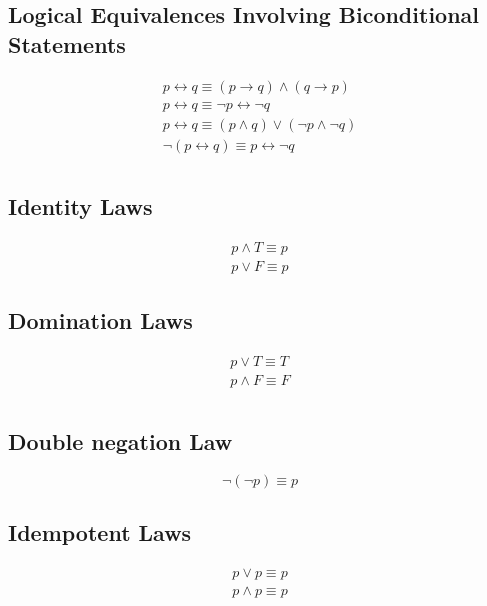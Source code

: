 \documentclass[12pt letter]{report}
\begin{document}
\subsection{Logical Equivalences Involving Biconditional Statements}

\begin{align*}
  p \leftrightarrow q \equiv \left( p\to q \right) \wedge \left( q \to   p \right)              \\
  p \leftrightarrow q \equiv \neg p \leftrightarrow \neg q                                      \\
  p \leftrightarrow q \equiv \left( p \wedge q \right) \vee \left( \neg p \wedge \neg q \right) \\
  \neg \left( p \leftrightarrow q \right) \equiv p \leftrightarrow \neg q                       \\
\end{align*}

\subsection{Identity Laws}

\begin{align*}
  p \wedge T \equiv p \\
  p \vee F  \equiv p
\end{align*}

\subsection{Domination Laws}

\begin{align*}
  p \vee T \equiv T    \\
  p \wedge  F \equiv F \\
\end{align*}

\subsection{Double negation Law}

\[
  \neg \left( \neg p \right) \equiv p
\]

\subsection{Idempotent Laws}

\begin{align*}
  p \vee p  \equiv p  \\
  p \wedge p \equiv p \\
\end{align*}
\end{document}
